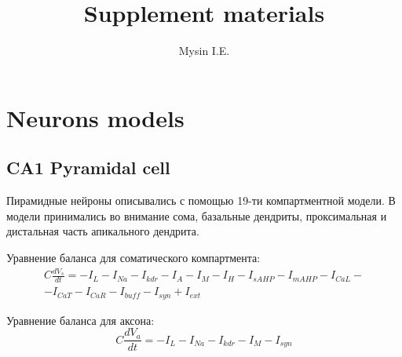 \documentclass[a4paper,12pt]{article}
\title{Supplement materials}
\author{Mysin I.E.}
\date{}
\begin{document}
\maketitle

\section{Neurons models}
\subsection{CA1 Pyramidal cell}
Пирамидные нейроны описывались с помощью 19-ти компартментной модели. В модели принимались во внимание сома, базальные дендриты, проксимальная и дистальная часть апикального дендрита. \par
Уравнение баланса для соматического компартмента:
\begin{eqnarray}
C\frac{dV_s}{dt}=-I_L-I_{Na}-I_{kdr}-I_A-I_M-I_H-I_{sAHP}-I_{mAHP}-I_{CaL}- \nonumber \\ -I_{CaT}-I_{CaR}-I_{buff}-I_{syn} + I_{ext}
\end{eqnarray}

Уравнение баланса для аксона:
\begin{equation}
C\frac{dV_a}{dt}=-I_L-I_{Na}-I_{kdr}-I_M-I_{syn}
\end{equation}
\end{document}

